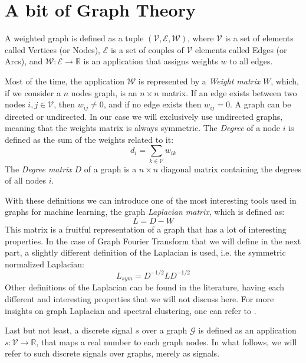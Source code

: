 \section{A bit of Graph Theory}

A weighted graph is defined as a tuple $(\mathcal{V,E,W})$, where $\mathcal{V}$ is a set of elements called Vertices (or Nodes), $\mathcal{E}$ is a set of couples of $\mathcal{V}$ elements called Edges (or Arcs), and $\mathcal{W: E}\rightarrow \mathbb{R}$ is an application that assigns weights $w$ to all edges. 

Most of the time, the application $\mathcal{W}$ is represented by a \emph{Weight matrix} $W$, which, if we consider a $n$ nodes graph, is an $n\times n$ matrix. If an edge exists between two nodes $i,j \in \mathcal{V}$, then $w_{ij}\neq 0$, and if no edge exists then $w_{ij}=0$. A graph can be directed or undirected. In our case we will exclusively use undirected graphs, meaning that the weights matrix is always symmetric. The \emph{Degree} of a node $i$ is defined as the sum of the weights related to it:
\begin{equation}
    d_i = \sum_{k\in\mathcal{V}}w_{ik}    
\end{equation}
The \emph{Degree matrix} $D$ of a graph is a $n\times n$ diagonal matrix containing the degrees of all nodes $i$.

With these definitions we can introduce one of the most interesting tools used in graphs for machine learning, the graph \emph{Laplacian matrix}, which is defined as:
\begin{equation}
    L = D -W
\end{equation}
This matrix is a fruitful representation of a graph that has a lot of interesting properties. In the case of Graph Fourier Transform that we will define in the next part, a slightly different definition of the Laplacian is used, i.e. the symmetric normalized Laplacian:
\begin{equation}
    L_{sym} = D^{-1/2}LD^{-1/2}
\end{equation}
Other definitions of the Laplacian can be found in the literature, having each different and interesting properties that we will not discuss here. For more insights on graph Laplacian and spectral clustering, one can refer to \cite{VonLuxburg2007}.

Last but not least, a discrete signal $s$ over a graph $\mathcal{G}$ is defined as an application $s:\mathcal{V}\rightarrow \mathbb{R}$, that maps a real number to each graph nodes. In what follows, we will refer to such discrete signals over graphs, merely as signals.
